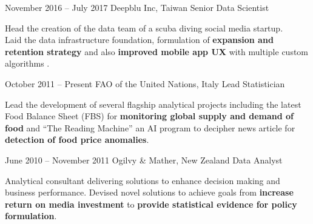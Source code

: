 \documentclass{tccv}
\begin{document}
\begin{eventlist}

\item{November 2016 -- July 2017}
  {Deepblu Inc, Taiwan}
  {Senior Data Scientist}

  Head the creation of the data team of a scuba diving social media
  startup.\\

  Laid the data infrastructure foundation, formulation of
  \textbf{expansion and retention strategy} and also \textbf{improved
    mobile app UX} with multiple custom algorithms .\\
 

\item{October 2011 -- Present}
  {FAO of the United Nations, Italy}
  {Lead Statistician}

  Lead the development of several flagship analytical projects
  including the latest Food Balance Sheet (FBS) for \textbf{monitoring
    global supply and demand of food} and ``The Reading Machine'' an AI
  program to decipher news article for \textbf{detection of food price
    anomalies}. \\




\item{June 2010 -- November 2011}
     {Ogilvy \& Mather, New Zealand}
     {Data Analyst}

     Analytical consultant delivering solutions to enhance decision
     making and business performance. Devised novel solutions to
     achieve goals from \textbf{increase return on media investment}
     to \textbf{provide statistical evidence for policy formulation}.


\end{eventlist}
\end{document}
